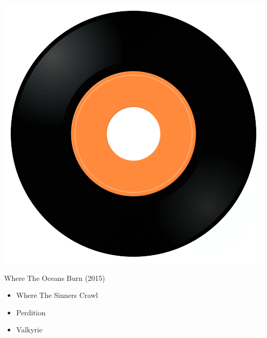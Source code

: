 \begin{minipage}[t]{0.25\textwidth}\vspace{0pt}
\captionsetup{type=figure}
\includegraphics[width=\textwidth]{Images/cover.png}
\caption*{Where The Oceans Burn (2015)}
\end{minipage}
\begin{minipage}[t]{0.25\textwidth}\vspace{0pt}
\begin{itemize}[nosep,leftmargin=1em,labelwidth=*,align=left]
	\setlength{\itemsep}{0pt}
	\item Where The Sinners Crawl
	\item Perdition
	\item Valkyrie
\end{itemize}
\end{minipage}

